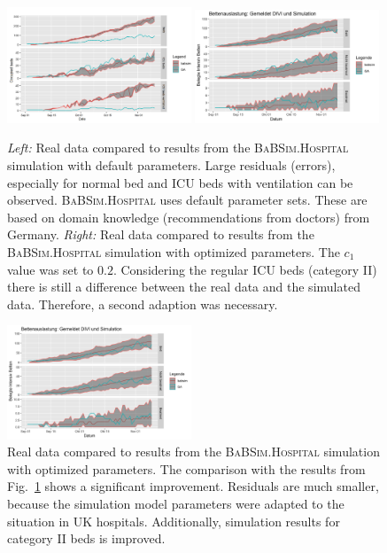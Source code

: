 \documentclass[conference]{IEEEtran}
\newcommand{\babsimhospital}{\textsc{BaBSim.Hospital}\xspace}
\begin{document}
\begin{figure}[t]
  \centering
   \includegraphics[width=0.49\textwidth]{default.png}
    \includegraphics[width=0.49\textwidth]{optimzed01b.png}
  \caption{\emph{Left:}\/ Real data compared to results from the \babsimhospital simulation with default parameters. Large residuals (errors), especially for normal bed and ICU beds with ventilation can be observed.
   \babsimhospital uses default parameter sets. These are based on domain knowledge (recommendations from doctors) from Germany. \emph{Right:}\/ Real data compared to results from the \babsimhospital simulation with optimized parameters. The  $c_1$ value was set to $0.2$. Considering the regular \gls{ICU} beds (category II) there is still a difference between the real data and the simulated data. Therefore, a second adaption was necessary. }
\label{fig:default}
\end{figure}
\begin{figure}[t]
    \centering
    \includegraphics[width=0.49\textwidth]{optimized02.png}
    \caption{Real data compared to results from the \babsimhospital simulation with optimized parameters. The comparison with the results from Fig.~\ref{fig:default} shows a significant improvement. Residuals are much smaller,
    because the simulation model parameters were adapted to the situation in UK hospitals. Additionally, simulation results for category II beds is improved.  
  }
\label{fig:optimized02}
\end{figure}
\end{document}
